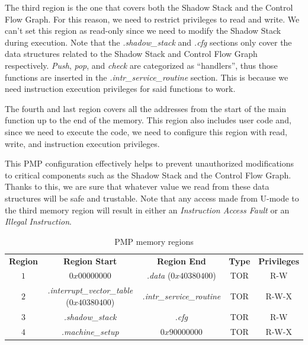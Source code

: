 The third region is the one that covers both the Shadow Stack and the Control
Flow Graph. For this reason, we need to restrict privileges to read and write. We
can't set this region as read-only since we need to modify the Shadow Stack during
execution. Note that the \textit{.shadow\_stack} and \textit{.cfg} sections only
cover the data structures related to the Shadow Stack and Control Flow Graph
respectively. \textit{Push}, \textit{pop}, and \textit{check} are categorized as
``handlers'', thus those functions are inserted in the \textit{.intr\_service\_routine}
section. This is because we need instruction execution privileges for said functions
to work.

The fourth and last region covers all the addresses from the start of the main function
up to the end of the memory. This region also includes user code and, since we need
to execute the code, we need to configure this region with read, write, and
instruction execution privileges.

This PMP configuration effectively helps to prevent unauthorized modifications
to critical components such as the Shadow Stack and the Control Flow Graph. Thanks
to this, we are sure that whatever value we read from these data structures will
be safe and trustable. Note that any access made from U-mode to the third memory
region will result in either an \textit{Instruction Access Fault} or an \textit{Illegal
Instruction}.

\begin{table}
  \centering
  \begin{tabular}{|c|c|c|c|c|}
    \hline
    \textbf{Region}    & \textbf{Region Start}                             & \textbf{Region End}              & \textbf{Type} & \textbf{Privileges} \\
    \hhline{=====} $1$ & $0x00000000$                                      & \textit{.data} ($0x40380400$)    & TOR           & R-W                 \\
    \hline
    $2$                & \textit{.interrupt\_vector\_table} ($0x40380400$) & \textit{.intr\_service\_routine} & TOR           & R-W-X               \\
    \hline
    $3$                & \textit{.shadow\_stack}                           & \textit{.cfg}                    & TOR           & R-W                 \\
    \hline
    $4$                & \textit{.machine\_setup}                          & $0x90000000$                     & TOR           & R-W-X               \\
    \hline
  \end{tabular}
  \caption{PMP memory regions}
  \label{tab:pmpregions}
\end{table}

